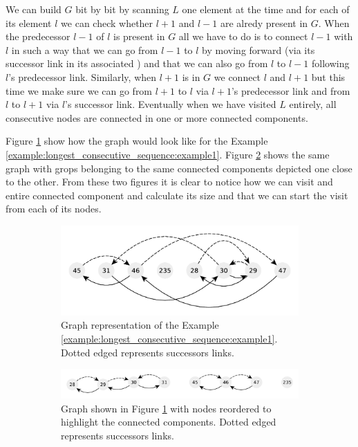 We can build $G$ bit by bit by scanning $L$ one element at the time and for each of its element $l$ we can check whether $l+1$ and $l-1$ are alredy present in $G$. 
When the predecessor $l-1$ of $l$ is present in $G$ all we have to do is to connect $l-1$ with $l$ in such a way that we can go from $l-1$ to $l$ by moving forward (via its successor link in its associated ) and that we can also go from $l$ to $l-1$ following $l$'s predecessor link.
Similarly, when $l+1$ is in $G$ we connect $l$ and $l+1$ but this time we make sure we can go from $l+1$ to $l$ via $l+1$'s predecessor link and from $l$ to $l+1$ via $l$'s successor link.
Eventually when we have visited $L$ entirely, all consecutive nodes are connected in one or more connected components. 

Figure \ref{fig:longest_consecutive_sequence:graph_example1} show how the graph would look like for the Example \ref{example:longest_consecutive_sequence:example1}. Figure \ref{fig:longest_consecutive_sequence:graph_example1_1} shows the same graph with grops belonging to the same connected components depicted one close to the other.
From these two figures it is clear to notice how we can visit and entire connected component and calculate its size  and that we can start the visit from each of its nodes.  

\begin{figure}
	\centering
	\begin{subfigure}[t]{0.99\textwidth}
		\includegraphics[width=1\linewidth]{sources/longest_consecutive_sequence/images/example_graph1}
		\caption{Graph representation of the Example \ref{example:longest_consecutive_sequence:example1}. Dotted edged represents successors links.}
		\label{fig:longest_consecutive_sequence:graph_example1}
	 \end{subfigure}
	\hfill
	\begin{subfigure}[t]{0.99\textwidth}
		\includegraphics[width=1\linewidth]{sources/longest_consecutive_sequence/images/example_graph1_1}
		\caption{Graph shown in Figure \ref{fig:longest_consecutive_sequence:graph_example1} with nodes reordered to highlight the connected components.
		Dotted edged represents successors links.}
		\label{fig:longest_consecutive_sequence:graph_example1_1}
	 \end{subfigure}
	 \caption[]{}
	  \label{}
\end{figure}



